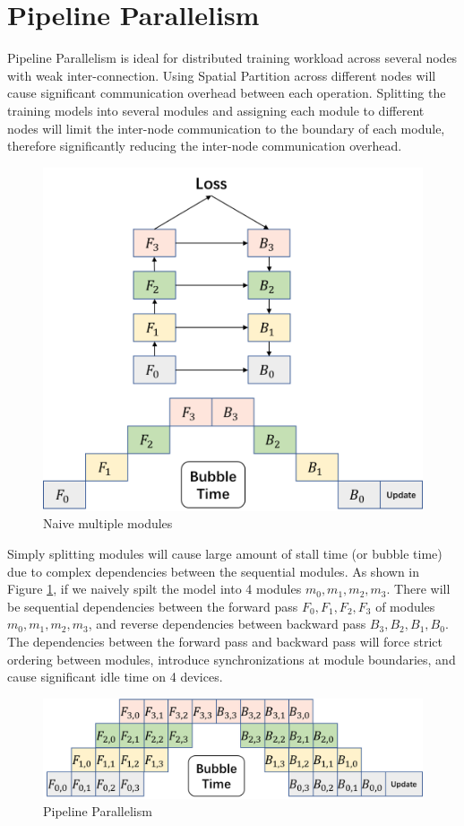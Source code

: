 \documentclass[sigplan, nonacm]{acmart}\settopmatter{printfolios=true,printccs=false,printacmref=false}
\begin{document}
 \section{Pipeline Parallelism} \label{pipelineparallism}
 Pipeline Parallelism is ideal for distributed training workload across several nodes with weak inter-connection. Using Spatial Partition across different nodes will cause significant communication overhead between each operation. Splitting the training models into several modules and assigning each module to different nodes will limit the inter-node communication to the boundary of each module, therefore significantly reducing the inter-node communication overhead.\par
 \begin{figure}[htbp]
  \centering
  \includegraphics[scale=0.4]{NormalPipeline}
  \caption{Naive multiple modules}
  \label{fig:multiplemodule}
\end{figure}
 Simply splitting modules will cause large amount of stall time (or bubble time) due to complex dependencies between the sequential modules. As shown in Figure \ref{fig:multiplemodule}, if we naively spilt the model into 4 modules $m_0,m_1,m_2,m_3$. There will be sequential dependencies between the forward pass $F_0, F_1, F_2, F_3$ of modules $m_0,m_1,m_2,m_3$, and reverse dependencies between backward pass $B_3, B_2, B_1, B_0$. The dependencies between the forward pass and backward pass will force strict ordering between modules, introduce synchronizations at module boundaries, and cause significant idle time on 4 devices. \par
 \begin{figure}[htbp]
  \centering
  \includegraphics[scale=0.45]{stackedpipeline}
  \caption{Pipeline Parallelism}
  \label{fig:stackedpipeline}
\end{figure}
\end{document}
